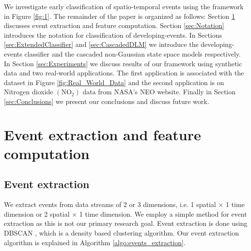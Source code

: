 \documentclass[11pt]{article}
\begin{document}
	
	We investigate early classification of spatio-temporal events using the framework in Figure \ref{fig:1}. The remainder of the paper is organized as follows: Section \ref{sec:EventExtract} discusses event extraction and feature computation. Section \ref{sec:Notation}  introduces the notation for classification of developing-events. In Sections \ref{sec:ExtendedClassifier} and  \ref{sec:CascadedDLM} we introduce the developing-events classifier and the cascaded non-Gaussian state space models respectively. %
	In Section \ref{sec:Experiments} we discuss results of our framework using synthetic data and two real-world applications. The first  application is associated with the dataset in Figure \ref{fig:Real_World_Data} and the second application is on Nitrogen dioxide $(\text{NO}_2)$ data from NASA's  NEO \cite{OMINO2} website. Finally in Section \ref{sec:Conclusions} we present our conclusions and discuss future work.  
	
		
	\section{Event extraction and feature computation} \label{sec:EventExtract}
	
	\subsection{Event extraction}
	 We extract events from data streams of 2 or 3 dimensions, i.e. 1 spatial $ \times $ 1 time dimension or 2 spatial $ \times $ 1 time dimension.  We employ a simple method for event extraction as this is not our primary research goal.  Event extraction is done using DBSCAN \cite{ester1996density}, which is a density based clustering algorithm. Our event extraction algorithm is explained in Algorithm \ref{algo:events_extraction}.
	 
\end{document}
